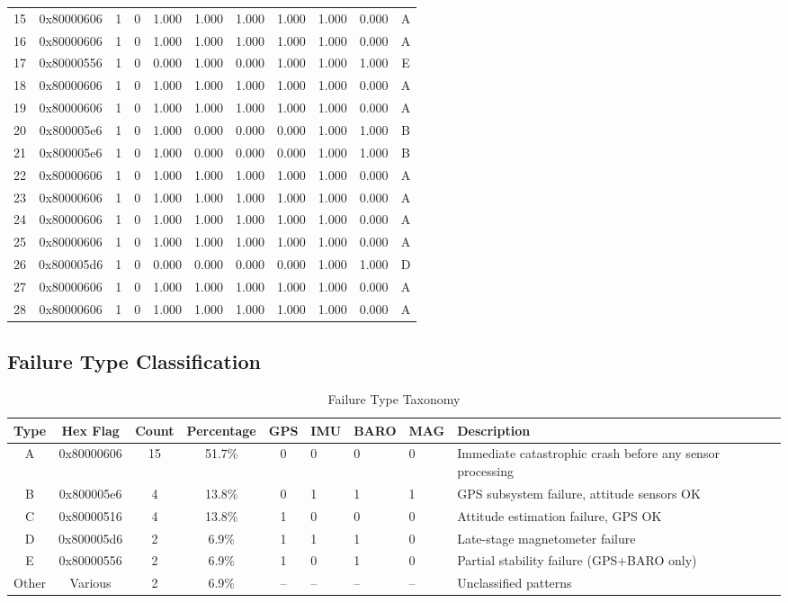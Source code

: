 \documentclass[11pt,a4paper]{article}
\begin{document}
\begin{longtable}{@{}ccccccccccc@{}}
15 & 0x80000606 & 1 & 0 & 1.000 & 1.000 & 1.000 & 1.000 & 1.000 & 0.000 & A \\
16 & 0x80000606 & 1 & 0 & 1.000 & 1.000 & 1.000 & 1.000 & 1.000 & 0.000 & A \\
17 & 0x80000556 & 1 & 0 & 0.000 & 1.000 & 0.000 & 1.000 & 1.000 & 1.000 & E \\
18 & 0x80000606 & 1 & 0 & 1.000 & 1.000 & 1.000 & 1.000 & 1.000 & 0.000 & A \\
19 & 0x80000606 & 1 & 0 & 1.000 & 1.000 & 1.000 & 1.000 & 1.000 & 0.000 & A \\
20 & 0x800005e6 & 1 & 0 & 1.000 & 0.000 & 0.000 & 0.000 & 1.000 & 1.000 & B \\
21 & 0x800005e6 & 1 & 0 & 1.000 & 0.000 & 0.000 & 0.000 & 1.000 & 1.000 & B \\
22 & 0x80000606 & 1 & 0 & 1.000 & 1.000 & 1.000 & 1.000 & 1.000 & 0.000 & A \\
23 & 0x80000606 & 1 & 0 & 1.000 & 1.000 & 1.000 & 1.000 & 1.000 & 0.000 & A \\
24 & 0x80000606 & 1 & 0 & 1.000 & 1.000 & 1.000 & 1.000 & 1.000 & 0.000 & A \\
25 & 0x80000606 & 1 & 0 & 1.000 & 1.000 & 1.000 & 1.000 & 1.000 & 0.000 & A \\
26 & 0x800005d6 & 1 & 0 & 0.000 & 0.000 & 0.000 & 0.000 & 1.000 & 1.000 & D \\
27 & 0x80000606 & 1 & 0 & 1.000 & 1.000 & 1.000 & 1.000 & 1.000 & 0.000 & A \\
28 & 0x80000606 & 1 & 0 & 1.000 & 1.000 & 1.000 & 1.000 & 1.000 & 0.000 & A \\
\end{longtable}

\subsection{Failure Type Classification}

\begin{table}[H]
\centering
\caption{Failure Type Taxonomy}
\label{tab:failure_types}
\begin{tabular}{@{}ccccclp{4cm}@{}}
\toprule
\textbf{Type} & \textbf{Hex Flag} & \textbf{Count} & \textbf{Percentage} & \textbf{GPS} & \textbf{IMU} & \textbf{BARO} & \textbf{MAG} & \textbf{Description} \\
\midrule
A & 0x80000606 & 15 & 51.7\% & 0 & 0 & 0 & 0 & Immediate catastrophic crash before any sensor processing \\
B & 0x800005e6 & 4 & 13.8\% & 0 & 1 & 1 & 1 & GPS subsystem failure, attitude sensors OK \\
C & 0x80000516 & 4 & 13.8\% & 1 & 0 & 0 & 0 & Attitude estimation failure, GPS OK \\
D & 0x800005d6 & 2 & 6.9\% & 1 & 1 & 1 & 0 & Late-stage magnetometer failure \\
E & 0x80000556 & 2 & 6.9\% & 1 & 0 & 1 & 0 & Partial stability failure (GPS+BARO only) \\
Other & Various & 2 & 6.9\% & -- & -- & -- & -- & Unclassified patterns \\
\bottomrule
\end{tabular}
\end{table}
\end{document}

